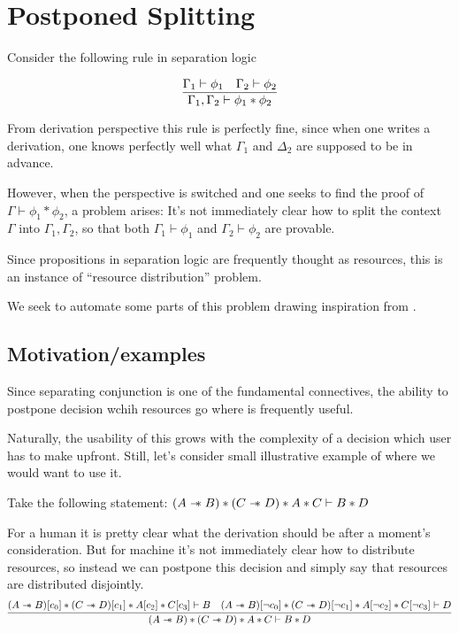 \chapter{Postponed Splitting}
\label{chap:postponed_splitting}


Consider the following rule in separation logic

$$\infer{\Gamma_1, \Gamma_2 \vdash \phi_1 \ast \phi_2}
      {\Gamma_1 \vdash \phi_1 &
       \Gamma_2 \vdash \phi_2}$$

From derivation perspective this rule is perfectly fine, since when one writes a derivation, one knows perfectly well what $\Gamma_1$ and $\Delta_2$ are supposed to be in advance.

However, when the perspective is switched and one seeks to find the proof of $\Gamma \vdash \phi_1 \ast \phi_2$, a problem arises:
It's not immediately clear how to split the context $\Gamma$ into $\Gamma_1, \Gamma_2$, so that both $\Gamma_1 \vdash \phi_1$ and $\Gamma_2 \vdash \phi_2$ are provable.

Since propositions in separation logic are frequently thought as resources, this is an instance of ``resource distribution'' problem.

We seek to automate some parts of this problem drawing inspiration from \citet{Harland_Pym_2003}.

\section{Motivation/examples}

Since separating conjunction is one of the fundamental connectives, the ability to postpone decision wchih resources go where is frequently useful.

Naturally, the usability of this grows with the complexity of a decision which user has to make upfront.
Still, let's consider small illustrative example of where we would want to use it.

Take the following statement:
$(A \mathrel{-\mkern-6mu*} B) \ast (C \mathrel{-\mkern-6mu*} D) \ast A \ast C \vdash B \ast D$

For a human it is pretty clear what the derivation should be after a moment's consideration.
But for machine it's not immediately clear how to distribute resources, so instead we can postpone this decision and simply say that resources are distributed disjointly.
$$
\infer{(A \wand B) \ast (C \wand D) \ast A \ast C \vdash B \ast D}
      {(A \wand B)[c_0] \ast (C \wand D)[c_1] \ast A[c_2] \ast C[c_3] \vdash B
       &
       (A \wand B)[\neg c_0] \ast (C \wand D)[\neg c_1] \ast A[\neg c_2] \ast C[\neg c_3] \vdash D}
$$

